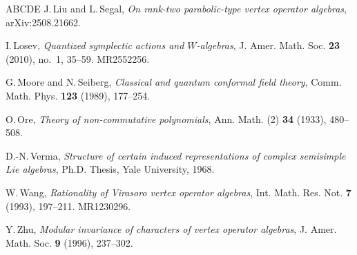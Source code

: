 \documentclass[12pt,a4paper,reqno]{amsart}
\numberwithin{equation}{section}
\numberwithin{equation}{section}
\theoremstyle{definition}
\begin{document}
\begin{thebibliography}{ABCDE}
	J.\,Liu and L.\,Segal,
	{\em On rank-two parabolic-type vertex operator algebras},
	arXiv:2508.21662.
	
	I.\,Losev,
	{\em Quantized symplectic actions and $W$-algebras},
	J. Amer. Math. Soc. \textbf{23} (2010), no.~1, 35--59. MR2552256.
	
	G.\,Moore and N.\,Seiberg,
	{\em Classical and quantum conformal field theory},
	Comm. Math. Phys. \textbf{123} (1989), 177--254.
	
	O.\,Ore,
	{\em Theory of non-commutative polynomials},
	Ann. Math. (2) \textbf{34} (1933), 480--508.
	
	D.-N.\,Verma,
	{\em Structure of certain induced representations of complex semisimple Lie algebras},
	Ph.D. Thesis, Yale University, 1968.
	
	W.\,Wang,
	{\em Rationality of Virasoro vertex operator algebras},
	Int. Math. Res. Not. \textbf{7} (1993), 197--211. MR1230296.
	
	Y.\,Zhu,
	{\em Modular invariance of characters of vertex operator algebras},
	J. Amer. Math. Soc. \textbf{9} (1996), 237--302.
	
			
		\end{thebibliography}
		
		
		
		
		
	
\end{document}
